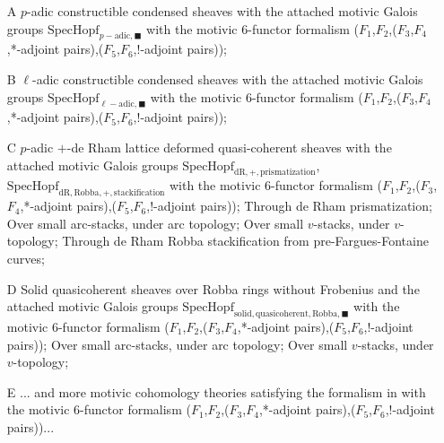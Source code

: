 \documentclass[12pt]{article}
\theoremstyle{definition}
\begin{document}
\begin{itemize}
\item[A] $p$-adic constructible condensed sheaves with the attached motivic Galois groups $\mathrm{Spec}\mathrm{Hopf}_{p-\text{adic},\blacksquare}$ with the motivic 6-functor formalism ($F_1$,$F_2$,($F_3$,$F_4$,*-adjoint pairs),($F_5$,$F_6$,!-adjoint pairs));
\item[B] $\ell$-adic constructible condensed sheaves with the attached motivic Galois groups $\mathrm{Spec}\mathrm{Hopf}_{\ell-\text{adic},\blacksquare}$ with the motivic 6-functor formalism ($F_1$,$F_2$,($F_3$,$F_4$,*-adjoint pairs),($F_5$,$F_6$,!-adjoint pairs));
\item[C] $p$-adic $+$-de Rham lattice deformed quasi-coherent sheaves with the attached motivic Galois groups $\mathrm{Spec}\mathrm{Hopf}_{\mathrm{dR},+,\text{prismatization}}$, $\mathrm{Spec}\mathrm{Hopf}_{\mathrm{dR},\mathrm{Robba},+,\text{stackification}}$ with the motivic 6-functor formalism ($F_1$,$F_2$,($F_3$,$F_4$,*-adjoint pairs),($F_5$,$F_6$,!-adjoint pairs));
\subitem[C1] Through de Rham prismatization;
\subsubitem[C11] Over small arc-stacks, under arc topology;
\subsubitem[C12] Over small $v$-stacks, under $v$-topology;
\subitem[C2] Through de Rham Robba stackification from pre-Fargues-Fontaine curves;
\item[D] Solid quasicoherent sheaves over Robba rings without Frobenius and the attached motivic Galois groups $\mathrm{Spec}\mathrm{Hopf}_{\mathrm{solid}, \mathrm{quasicoherent},\mathrm{Robba},\blacksquare}$ with the motivic 6-functor formalism ($F_1$,$F_2$,($F_3$,$F_4$,*-adjoint pairs),($F_5$,$F_6$,!-adjoint pairs));
\subitem[D1] Over small arc-stacks, under arc topology;
\subitem[D2] Over small $v$-stacks, under $v$-topology;
\item[E] ... and more motivic cohomology theories satisfying the formalism in \cite{2A} with the motivic 6-functor formalism ($F_1$,$F_2$,($F_3$,$F_4$,*-adjoint pairs),($F_5$,$F_6$,!-adjoint pairs))...
\end{itemize}
\end{document}
